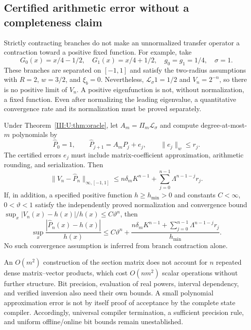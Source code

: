 \subsection{Certified arithmetic error without a completeness claim}
\label{III:U:sec:transfer-rounding}
Strictly contracting branches do not make an unnormalized transfer
operator a contraction toward a positive fixed function.
For example, take
\[
 G_0(x)=x/4-1/2,\quad G_1(x)=x/4+1/2,\quad
 g_0=g_1=1/4,\quad \sigma=1.
\]
These branches are separated on $[-1,1]$ and satisfy the two-radius
assumptions with $R=2$, $w=3/2$, and $\xi_b=0$. Nevertheless,
$\mathcal L_\sigma1=1/2$ and $V_n=2^{-n}$, so there is no positive
limit of $V_n$. A positive
eigenfunction is not, without normalization, a fixed function.
Even after normalizing the leading eigenvalue, a quantitative
convergence rate and its normalization must be proved separately.

\begin{theorem}
\label{III:U:thm:transfer-rounding}
Under Theorem~\ref{III:U:thm:oracle}, let
$A_m=\Pi_m\mathcal L_\sigma$ and compute degree-at-most-$m$
polynomials by
\[
 \widehat P_0=1,\qquad
 \widehat P_{j+1}=A_m\widehat P_j+e_j,\qquad
 \|e_j\|_w\le r_j.
\]
The certified errors $e_j$ must include matrix-coefficient approximation,
arithmetic rounding, and serialization. Then
\begin{equation}
 \|V_n-\widehat P_n\|_{\infty,[-1,1]}
 \le n\delta_m K^{n-1}
                   +\sum_{j=0}^{n-1}\Lambda^{n-1-j}r_j.
 \label{III:U:eq:transfer-rounded-error}
\end{equation}
If, in addition, a specified positive function $h\ge h_{\min}>0$
and constants $C<\infty$, $0<\vartheta<1$ satisfy the independently
proved normalization and convergence bound
$\sup_x|V_n(x)-h(x)|/h(x)\le C\vartheta^n$, then
\begin{equation}
 \sup_x\frac{|\widehat P_n(x)-h(x)|}{h(x)}
 \le C\vartheta^n+
 \frac{n\delta_mK^{n-1}
                 +\sum_{j=0}^{n-1}\Lambda^{n-1-j}r_j}{h_{\min}}.
 \label{III:U:eq:transfer-conditional-eigenfunction}
\end{equation}
No such convergence assumption is inferred from branch contraction alone.
\end{theorem}


An $O(m^2)$ construction of the section matrix does not account for
$n$ repeated dense matrix--vector products, which cost $O(nm^2)$
scalar operations without further structure. Bit precision, evaluation
of real powers, interval dependency, and verified inversion also need
their own bounds. A small polynomial approximation error is not by
itself proof of acceptance by the complete state compiler.
Accordingly, universal compiler termination, a sufficient precision rule, and uniform offline/online bit bounds remain unestablished.


